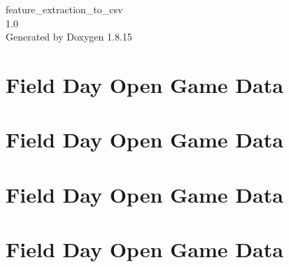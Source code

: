 \let\mypdfximage\pdfximage\def\pdfximage{\immediate\mypdfximage}\documentclass[twoside]{book}
\newcommand{\+}{\discretionary{\mbox{\scriptsize$\hookleftarrow$}}{}{}}
\newcommand{\clearemptydoublepage}{%
  \newpage{\pagestyle{empty}\cleardoublepage}%
}
\begin{document}
\hypersetup{pageanchor=false,
             bookmarksnumbered=true,
             pdfencoding=unicode
            }
\begin{titlepage}
\vspace*{7cm}
\begin{center}%
{\Large feature\+\_\+extraction\+\_\+to\+\_\+csv \\[1ex]\large 1.\+0 }\\
\vspace*{1cm}
{\large Generated by Doxygen 1.8.15}\\
\end{center}
\end{titlepage}
\clearemptydoublepage
{}
\tableofcontents
\clearemptydoublepage
{}
\hypersetup{pageanchor=true}

\chapter{Field Day Open Game Data}
\label{md_data__c_r_y_s_t_a_l__c_r_y_s_t_a_l_20190801_to_20190831_readme}

\chapter{Field Day Open Game Data}
\label{md_data__c_r_y_s_t_a_l__c_r_y_s_t_a_l_20190801_to_20190831_2_readme}

\chapter{Field Day Open Game Data}
\label{md_data__c_r_y_s_t_a_l__c_r_y_s_t_a_l_20190801_to_20190831_3_readme}

\chapter{Field Day Open Game Data}
\label{md_data__c_r_y_s_t_a_l__c_r_y_s_t_a_l_20190801_to_20190831_4_readme}

\end{document}
